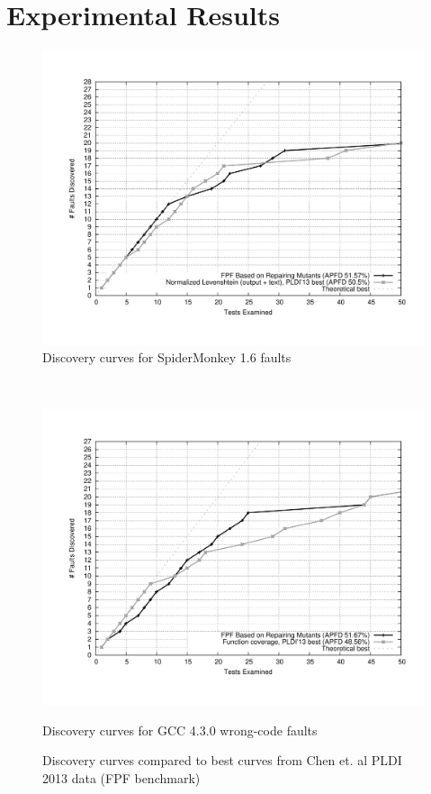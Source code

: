 \section{Experimental Results}

\begin{figure}
    \centering
        \includegraphics[width=1.0\textwidth]{jscurve}
        \caption{Discovery curves for SpiderMonkey 1.6 faults}
        \label{jscurves}
 \end{figure}%
    ~ 
    \begin{figure}
        \centering
        \includegraphics[width=1.0\textwidth]{gcccurve}
        \caption{Discovery curves for GCC 4.3.0 wrong-code faults}
        \label{gcccurves}
    \caption{Discovery curves compared to best curves from Chen et. al PLDI 2013 data (FPF benchmark)}
\end{figure}


